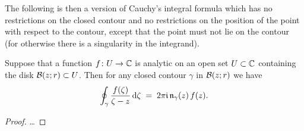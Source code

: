 The following is then a version of Cauchy's integral formula
which has no restrictions on the closed contour and
no restrictions on the position of the point with respect to
the contour, except that the point must not lie on the contour
(for otherwise there is a singularity in the integrand).

\begin{theorem}
  \label{thm:CAUCHY_FORMULA}
  Suppose that a function $f \colon U \to \bC$ is analytic on an open
  set $U \subset \bC$ containing the disk $\DiskRC{r}{z} \subset U$.
  Then for any closed contour $\gamma$ in $\DiskRC{r}{z}$ we have
  \begin{align*}
    \oint_\gamma \frac{f(\zeta)}{\zeta - z} \, \ud \zeta
    \; = \; 2\pi \ii \, \windN{\gamma}{z} \, f(z) .
  \end{align*}
\end{theorem}
\begin{proof}
  \ldots
\end{proof}
